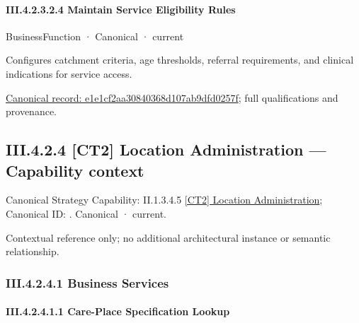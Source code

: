 \paragraph*{III.4.2.3.2.4 Maintain Service Eligibility Rules}
\label{navigation:III.4.2.3.2.4}

\label{element:e1e1cf2aa30840368d107ab9dfd0257f}
{\small BusinessFunction · Canonical · current}\par

Configures catchment criteria, age thresholds, referral requirements, and clinical indications for service access.


{\footnotesize \href{../../../../../../../continuum/business/business-function/e1e1cf2aa30840368d107ab9dfd0257f.md}{Canonical record: e1e1cf2aa30840368d107ab9dfd0257f}; full qualifications and provenance.}\par
\subsection*{III.4.2.4 [CT2] Location Administration — Capability context}
\label{navigation:III.4.2.4}

{\small Canonical Strategy Capability: II.1.3.4.5 \hyperref[element:c410005667444f99a221483bf577fad2]{[CT2] Location Administration}; Canonical ID: \texttt{}. Canonical · current.}\par
Contextual reference only; no additional architectural instance or semantic relationship.\par
\subsubsection*{III.4.2.4.1 Business Services}
\label{navigation:III.4.2.4.1}

\paragraph*{III.4.2.4.1.1 Care-Place Specification Lookup}
\label{navigation:III.4.2.4.1.1}

